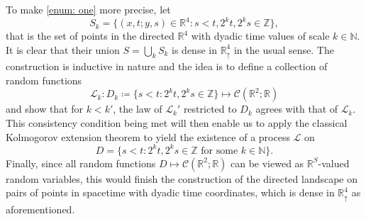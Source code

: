 \documentclass[12pt]{report}
\theoremstyle{plain}
\newcommand{\N}{\ensuremath{\mathbb{N}}}
\newcommand{\R}{\ensuremath{\mathbb{R}}}
\newcommand{\Z}{\ensuremath{\mathbb{Z}}}
\begin{document}
To make \ref{enum: one} more precise, let
\[
S_k = \{(x,t;y,s)\in \R^4: s<t, 2^kt, 2^ks\in\Z\},
\]
\noindent that is the set of points in the directed \(\R^4\) with dyadic time values of scale \(k\in\N\). It is clear that their union \(S =\bigcup_{k} S_k\) is dense in \(\R^4_\uparrow\) in the usual sense. The construction is inductive in nature and the idea is to define a collection of random functions 
\[
\mathcal{L}_k: D_k \coloneqq \{s<t: 2^kt, 2^ks\in\Z\} \longmapsto \mathcal{C}(\R^2; \R)
\]
and show that for \(k<k'\), the law of \(\mathcal{L}_k'\) restricted to \(D_k\) agrees with that of \(\mathcal{L}_k\). This consistency condition being met will then enable us to apply the classical Kolmogorov extension theorem to yield the existence of a process \(\mathcal{L}\) on 
\[
 D = \{s<t: 2^kt, 2^ks\in\Z \text{ for some } k\in \N\}.
\]
Finally, since all random functions \(D \mapsto \mathcal{C}(\R^2; \R)\) can be viewed as \(\R^S\)-valued random variables, this would finish the construction of the directed landscape on pairs of points in spacetime with dyadic time coordinates, which is dense in \(\R^4_\uparrow\) as aforementioned.\\
\end{document}
